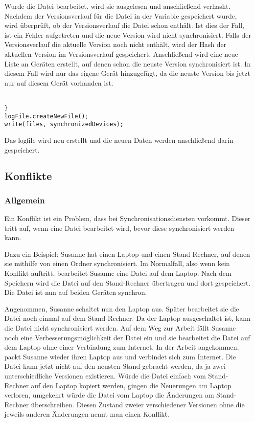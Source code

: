 Wurde die Datei bearbeitet, wird sie ausgelesen und anschließend verhasht. Nachdem der Versionsverlauf für die Datei in der Variable  gespeichert wurde, wird überprüft, ob der Versionsverlauf die Datei schon enthält. Ist dies der Fall, ist ein Fehler aufgetreten und die neue Version wird nicht synchronisiert. Falls der Versionsverlauf die aktuelle Version noch nicht enthält, wird der Hash der aktuellen Version im Versionsverlauf gespeichert. Anschließend wird eine neue Liste an Geräten erstellt, auf denen schon die neuste Version synchronisiert ist. In diesem Fall wird nur das eigene Gerät hinzugefügt, da die neuste Version bis jetzt nur auf diesem Gerät vorhanden ist. \\ \\
\javalisting
\begin{minipage}{\linewidth}
\begin{lstlisting}[caption={Schreiben des \gls{logfile}s},captionpos=b]
}
logFile.createNewFile();
write(files, synchronizedDevices);
\end{lstlisting}
\end{minipage}
Das \gls{logfile} wird neu erstellt und die neuen Daten werden anschließend darin gespeichert.
\subsection{Konflikte}\label{Konflikt}
\subsubsection{Allgemein}
Ein Konflikt ist ein Problem, dass bei Synchronisationsdiensten vorkommt. Dieser tritt auf, wenn eine Datei bearbeitet wird, bevor diese synchronisiert werden kann. 

Dazu ein Beispiel: Susanne hat einen Laptop und einen Stand-Rechner, auf denen sie mithilfe von \sblit einen Ordner synchronisiert. Im Normalfall, also wenn kein Konflikt auftritt, bearbeitet Susanne eine Datei auf dem Laptop. Nach dem Speichern wird die Datei auf den Stand-Rechner übertragen und dort gespeichert. Die Datei ist nun auf beiden Geräten synchron.

Angenommen, Susanne schaltet nun den Laptop aus. Später bearbeitet sie die Datei noch einmal auf dem Stand-Rechner. Da der Laptop ausgeschaltet ist, kann die Datei nicht synchronisiert werden. Auf dem Weg zur Arbeit fällt Susanne noch eine Verbesserungsmöglichkeit der Datei ein und sie bearbeitet die Datei auf dem Laptop ohne einer Verbindung zum Internet. In der Arbeit angekommen, packt Susanne wieder ihren Laptop aus und verbindet sich zum Internet. Die Datei kann jetzt nicht auf den neusten Stand gebracht werden, da ja zwei unterschiedliche Versionen existieren. Würde die Datei einfach vom Stand-Rechner auf den Laptop kopiert werden, gingen die Neuerungen am Laptop verloren, umgekehrt würde die Datei vom Laptop die Änderungen am Stand-Rechner überschreiben. Diesen Zustand zweier verschiedener Versionen ohne die jeweils anderen Änderungen nennt man einen Konflikt.

